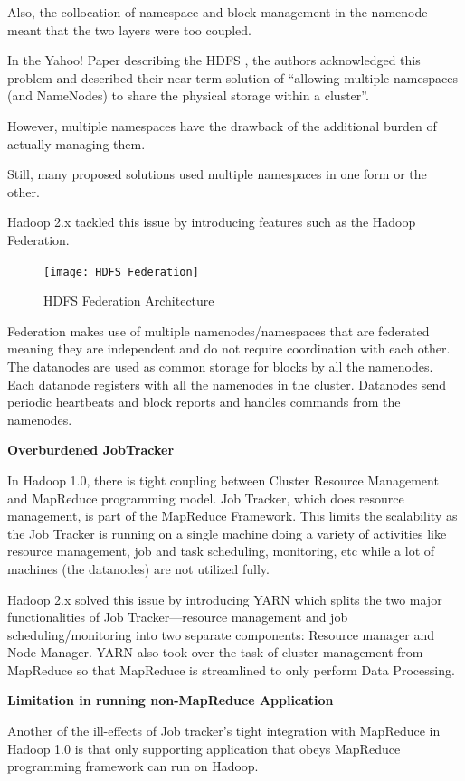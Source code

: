 \documentclass[conference]{IEEEtran}
\begin{document}
Also, the collocation of namespace and block management in the namenode meant that the two layers were too coupled. 

In the Yahoo! Paper describing the HDFS \cite{Shvachko2010b}, the authors acknowledged this problem and described their near term 
solution of “allowing multiple namespaces (and NameNodes) to share the physical storage within a cluster”.

However, multiple namespaces have the drawback of the additional burden of actually managing them. 

Still, many proposed solutions used multiple namespaces in one form or the other. \cite{Singh2012}

Hadoop 2.x tackled this issue by introducing features such as the Hadoop Federation.

\begin{figure}[h!]
        \centering
        \texttt{[image: HDFS\_Federation]}
        \caption{HDFS Federation Architecture}
\end{figure}

Federation makes use of multiple namenodes/namespaces that are federated meaning they are independent and do not 
require coordination with each other. The datanodes are used as common storage for blocks by all the namenodes. 
Each datanode registers with all the namenodes in the cluster. Datanodes send periodic heartbeats and block reports 
and handles commands from the namenodes.\cite{Suresh2011}

\textbf{Overburdened JobTracker}

In Hadoop 1.0, there is tight coupling between Cluster Resource Management and MapReduce programming model. 
Job Tracker, which does resource management, is part of the MapReduce Framework. 
This limits the scalability as the Job Tracker is running on a single machine doing a variety of activities like 
resource management, job and task scheduling, monitoring, etc while a lot of machines (the datanodes) are not utilized fully.

Hadoop 2.x solved this issue by introducing YARN which splits the two major functionalities of Job Tracker—resource 
management and job scheduling/monitoring into two separate components: Resource manager and Node Manager. 
YARN also took over the task of cluster management from MapReduce so that MapReduce is streamlined to only perform Data Processing.

\textbf{Limitation in running non-MapReduce Application}

Another of the ill-effects of Job tracker’s tight integration with MapReduce in Hadoop 1.0 is that only supporting application 
that obeys MapReduce programming framework can run on Hadoop. 
\end{document}
